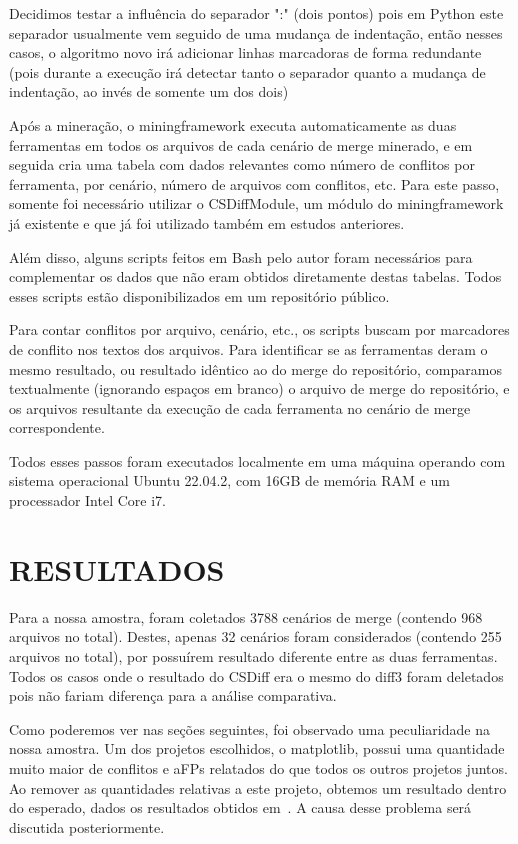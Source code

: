 Decidimos testar a influência do separador ":" (dois pontos) pois em Python este separador usualmente vem seguido de uma
mudança de indentação, então nesses casos, o algoritmo novo irá adicionar linhas marcadoras de forma redundante (pois
durante a execução irá detectar tanto o separador quanto a mudança de indentação, ao invés de somente um dos dois)

Após a mineração, o miningframework executa automaticamente as duas ferramentas em todos os arquivos de cada cenário de merge
minerado, e em seguida cria uma tabela com dados relevantes como número de conflitos por
ferramenta, por cenário, número de arquivos com conflitos, etc. Para este passo, somente foi necessário utilizar
o CSDiffModule, um módulo do miningframework já existente e que já foi utilizado também em estudos anteriores.

Além disso, alguns scripts feitos em Bash pelo autor foram necessários para complementar os dados que não eram obtidos
diretamente destas tabelas. Todos esses scripts estão disponibilizados em um repositório público. %

Para contar conflitos por arquivo,
cenário, etc., os scripts buscam por marcadores
de conflito nos textos dos arquivos. Para identificar se as ferramentas deram o mesmo resultado,
ou resultado idêntico ao do merge
do repositório, comparamos textualmente (ignorando espaços em
branco) o arquivo de merge do repositório, e os arquivos resultante da execução de cada
ferramenta no cenário de merge correspondente.

Todos esses passos foram executados localmente em uma máquina operando com sistema operacional Ubuntu 22.04.2,
com 16GB de memória
RAM e um processador Intel Core i7.

\section{RESULTADOS}
Para a nossa amostra, foram coletados 3788 cenários de merge (contendo 968 arquivos
no total). Destes, apenas 32 cenários foram considerados (contendo 255 arquivos no total), por possuírem resultado
diferente entre as duas ferramentas. Todos os casos onde o resultado do CSDiff era o mesmo do diff3
foram deletados pois não fariam
diferença para a análise comparativa.

Como poderemos ver nas seções seguintes, foi observado uma peculiaridade na nossa amostra. Um dos projetos escolhidos, o
matplotlib, possui uma quantidade muito maior de conflitos e aFPs relatados do que todos os outros projetos juntos. Ao remover
as quantidades relativas a este projeto, obtemos um resultado dentro do esperado, dados os resultados obtidos
em~\cite{clem21,heitor21}. A causa desse problema será discutida posteriormente.

